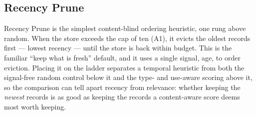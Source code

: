 
\subsection{Recency Prune}

Recency Prune is the simplest content-blind ordering heuristic, one rung above random. When
the store exceeds the cap of ten (A1), it evicts the oldest records first --- lowest
recency --- until the store is back within budget. This is the familiar ``keep what is
fresh'' default, and it uses a single signal, age, to order eviction. Placing it on the
ladder separates a temporal heuristic from both the signal-free random control below it and
the type- and use-aware scoring above it, so the comparison can tell apart recency from
relevance: whether keeping the \emph{newest} records is as good as keeping the records a
content-aware score deems most worth keeping.
